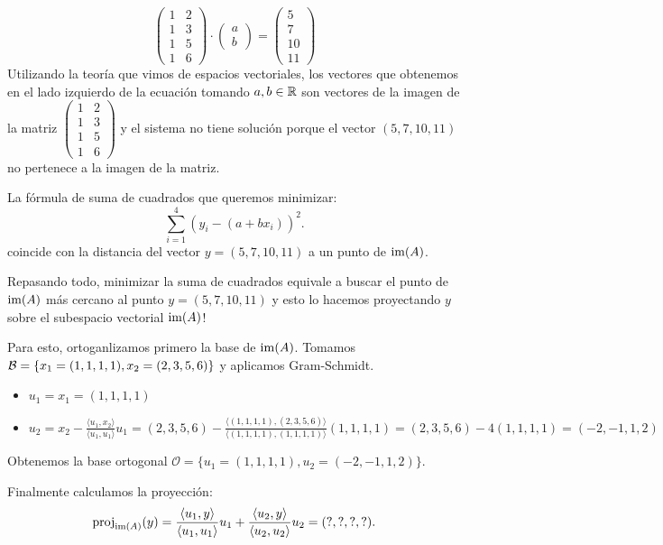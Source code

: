 \begin{aplicacion}
$$\begin{pmatrix}1&2\\ 1 & 3 \\ 1 & 5 \\ 1 & 6 \end{pmatrix} \cdot \begin{pmatrix}a\\ b \end{pmatrix} = \begin{pmatrix}5\\ 7 \\10 \\ 11 \end{pmatrix}$$ Utilizando la teoría que vimos de espacios vectoriales, los vectores que obtenemos en el lado izquierdo de la ecuación tomando $a, b \in \mathbb R$ son vectores de la imagen de la matriz $\begin{pmatrix}1&2\\ 1 & 3 \\ 1 & 5 \\ 1 & 6 \end{pmatrix}$ y el sistema no tiene solución porque el vector $(5, 7, 10, 11)$ no pertenece a la imagen de la matriz.

La fórmula de suma de cuadrados que queremos minimizar: $$
\sum_{i = 1}^4 (y_i - (a + bx_i))^2.
$$coincide con la distancia del vector $y = (5, 7, 10, 11)$ a un punto de $\operatorname{im}(A)$.

Repasando todo, minimizar la suma de cuadrados equivale a buscar el punto de $\operatorname{im}(A)$ más cercano al punto $y = (5, 7, 10, 11)$ y esto lo hacemos proyectando $y$ sobre el subespacio vectorial $\operatorname{im}(A)$!

Para esto, ortoganlizamos primero la base de $\operatorname{im}(A)$. Tomamos $\mathcal B = \{x_1 = (1,1,1,1), x_2 = (2,3,5,6)\}$ y aplicamos Gram-Schmidt.

\begin{itemize}
\item   $u_1 = x_1 = (1,1,1,1)$
\item $u_2 = x_2 - \frac{\langle u_1, x_2 \rangle}{\langle u_1, u_1\rangle} u_1 = (2,3,5,6) - \frac{\langle (1,1,1,1), (2,3,5,6) \rangle}{\langle (1,1,1,1), (1,1,1,1)\rangle} (1,1,1,1) = (2,3,5,6) - 4 (1,1,1,1) = (-2, -1, 1, 2)$
\end{itemize}

Obtenemos la base ortogonal $\mathcal{O} = \{u_1 = (1,1,1,1), u_2 = (-2, -1, 1, 2)\}$.

Finalmente calculamos la proyección: $$
\operatorname{proj}_{\operatorname{im}(A)}(y) = \frac{\langle u_1, y\rangle}{\langle u_1, u_1\rangle} u_1 + \frac{\langle u_2, y\rangle}{\langle u_2, u_2\rangle} u_2 = (?,?,?,?).
$$


\end{aplicacion}
